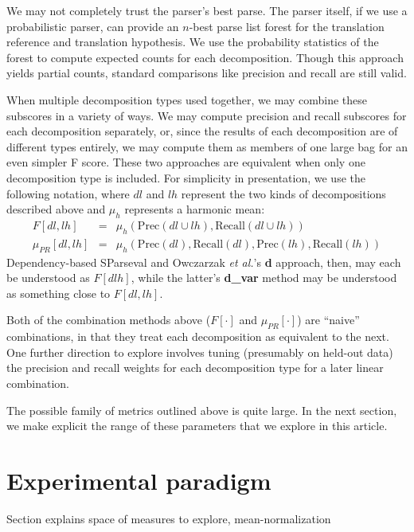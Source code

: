 \documentclass{kluwer}    %
\newcommand{\precision}[1]{\ensuremath{\textrm{Prec}\left(#1\right)}}
\newcommand{\recall}[1]{\ensuremath{\textrm{Recall}\left(#1\right)}}
\begin{document}
\begin{article}
We may not completely trust the parser's best parse.  The parser
itself, if we use a probabilistic parser, can provide an $n$-best
parse list forest for the translation reference and translation
hypothesis. We use the probability statistics of the forest to compute
expected counts for each decomposition. Though this approach yields
partial counts, standard comparisons like precision and recall are
still valid.

When multiple decomposition types used together, we may combine these
subscores in a variety of ways.  We may compute precision and recall
subscores for each decomposition separately, or, since the results of
each decomposition are of different types entirely, we may compute
them as members of one large bag for an even simpler F score.  These
two approaches are equivalent when only one decomposition type is
included.  For simplicity in presentation, we use the following
notation, where $dl$ and $lh$ represent the two kinds of
decompositions described above and $\mu_h$ represents a harmonic mean:
\begin{eqnarray}
  \label{eq:fprmeans}
  F[dl,lh] & = &
  \mu_h \left( \precision{dl \cup lh},
    \recall{dl \cup lh} \right) \\
  \mu_{PR}[dl,lh]  & = & \mu_h \left( \precision{dl},
    \recall{dl}, \precision{lh}, \recall{lh} \right)    
\end{eqnarray}
Dependency-based SParseval and Owczarzak \textit{et al.}'s
\cite*{owczarzak07labelleddepseval} \textbf{d} approach, then, may
each be understood as $F[dlh]$, while the latter's \textbf{d\_var}
method may be understood as something close to $F[dl,lh]$.

Both of the combination methods above ($F[\cdot]$ and
$\mu_{PR}[\cdot]$) are ``naive'' combinations, in that they treat each
decomposition as equivalent to the next.  One further direction to
explore involves tuning (presumably on held-out data) the precision
and recall weights for each decomposition type for a later linear
combination.

The possible family of metrics outlined above is quite large. In the
next section, we make explicit the range of these parameters that we
explore in this article.


\section{Experimental paradigm}
\label{sec:paradigm}

Section explains space of measures to explore, mean-normalization


\end{article}
\end{document}
